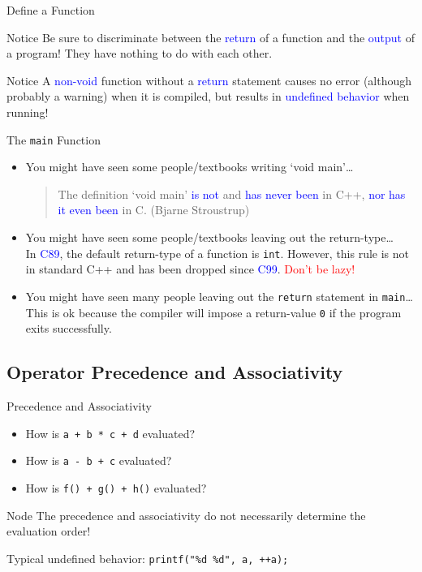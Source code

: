 \documentclass{beamer}
\newcommand{\red}[1]{\textcolor{red}{#1}}
\newcommand{\blue}[1]{\textcolor{blue}{#1}}
\begin{document}
\begin{frame}{Define a Function}
    \begin{alertblock}{Notice}
        Be sure to discriminate between the \blue{return} of a function and the \blue{output} of a program! They have nothing to do with each other.
    \end{alertblock}
    \pause
    \begin{alertblock}{Notice}
        A \blue{non-void} function without a \blue{return} statement causes no error (although probably a warning) when it is compiled, but results in \blue{undefined behavior} when running!
    \end{alertblock}
\end{frame}

\begin{frame}{The \texttt{main} Function}
    \begin{itemize}
        \item You might have seen some people/textbooks writing `void main'\dots\\[0.7em]
        \pause
        \begin{quote}
            The definition `void main' \blue{is not} and \blue{has never been} in C++, \blue{nor has it even been} in C. (Bjarne Stroustrup)
        \end{quote}
        \pause
        \item You might have seen some people/textbooks leaving out the return-type\dots\\[0.7em]
        \pause
        In \blue{C89}, the default return-type of a function is \texttt{int}. However, this rule is not in standard C++ and has been dropped since \blue{C99}. \red{Don't be lazy!}
        \pause
        \item You might have seen many people leaving out the \texttt{return} statement in \texttt{main}\dots\\[0.7em]
        \pause
        This is ok because the compiler will impose a return-value \texttt{0} if the program exits successfully.
    \end{itemize}
\end{frame}

\subsection{Operator Precedence and Associativity}

\begin{frame}{Precedence and Associativity}
    \begin{itemize}
        \item How is \texttt{a + b * c + d} evaluated?
        \item How is \texttt{a - b + c} evaluated?
        \item How is \texttt{f() + g() + h()} evaluated?
    \end{itemize}
    \pause
    \begin{alertblock}{Node}
        The precedence and associativity do not necessarily determine the evaluation order!
    \end{alertblock}
    \pause
    Typical undefined behavior: \texttt{printf("\%d \%d", a, ++a);}
\end{frame}
\end{document}
